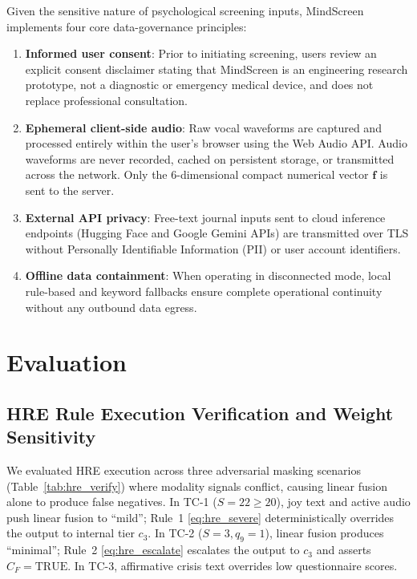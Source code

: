 \documentclass[10pt, conference, letterpaper]{IEEEtran}
\begin{document}
Given the sensitive nature of psychological screening inputs, MindScreen implements
four core data-governance principles:
\begin{enumerate}
  \item \textbf{Informed user consent}: Prior to initiating screening, users review
    an explicit consent disclaimer stating that MindScreen is an engineering research
    prototype, not a diagnostic or emergency medical device, and does not replace professional
    consultation.
  \item \textbf{Ephemeral client-side audio}: Raw vocal waveforms are captured and
    processed entirely within the user's browser using the Web Audio API. Audio waveforms
    are never recorded, cached on persistent storage, or transmitted across the network.
    Only the 6-dimensional compact numerical vector $\mathbf{f}$ is sent to the server.
  \item \textbf{External API privacy}: Free-text journal inputs sent to cloud inference
    endpoints (Hugging Face and Google Gemini APIs) are transmitted over TLS without
    Personally Identifiable Information (PII) or user account identifiers.
  \item \textbf{Offline data containment}: When operating in disconnected mode, local
    rule-based and keyword fallbacks ensure complete operational continuity without any
    outbound data egress.
\end{enumerate}

\section{Evaluation}
\label{sec:eval}

\subsection{HRE Rule Execution Verification and Weight Sensitivity}

We evaluated HRE execution across three adversarial masking scenarios
(Table~\ref{tab:hre_verify}) where modality signals conflict, causing linear
fusion alone to produce false negatives.
In TC-1 ($S=22 \ge 20$), joy text and active audio push linear fusion to
``mild''; Rule~1 \eqref{eq:hre_severe} deterministically overrides the output
to internal tier $c_3$.
In TC-2 ($S=3, q_9=1$), linear fusion produces ``minimal''; Rule~2
\eqref{eq:hre_escalate} escalates the output to $c_3$ and asserts $C_F = \text{TRUE}$.
In TC-3, affirmative crisis text overrides low questionnaire scores.
\end{document}
